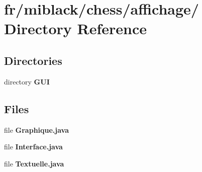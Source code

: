 \section{fr/miblack/chess/affichage/ Directory Reference}
\label{dir_cbe08a181fc913ef0d1e6c149c872214}
\subsection*{Directories}
\begin{DoxyCompactItemize}
\item 
directory {\bf G\-U\-I}
\end{DoxyCompactItemize}
\subsection*{Files}
\begin{DoxyCompactItemize}
\item 
file {\bfseries Graphique.\-java}
\item 
file {\bfseries Interface.\-java}
\item 
file {\bfseries Textuelle.\-java}
\end{DoxyCompactItemize}
